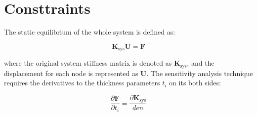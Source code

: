 
\section{Consttraints}

The static equilibrium of the whole system is defined as:

\begin{equation}\label{key}
\mathbf{K}_\mathrm{sys} \mathbf{U} = \mathbf{F}
\end{equation}

where the original system stiffness matrix is denoted as $ \mathbf{K}_\mathrm{sys} $, and the displacement for each node is represented as $ \mathbf{U} $. The sensitivity analysis technique requires the derivatives to the thickness parameters $ t_i $ on its both sides:

\begin{equation}\label{key}
\frac{\partial \mathbf{F}}{\partial t_i} = \frac{\partial \mathbf{K}_\mathrm{sys}}{den}
\end{equation}